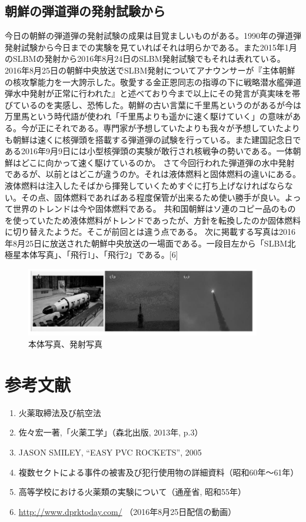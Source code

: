 \subsection{朝鮮の弾道弾の発射試験から}
今日の朝鮮の弾道弾の発射試験の成果は目覚ましいものがある。1990年の弾道弾発射試験から今日までの実験を見ていればそれは明らかである。また2015年1月のSLBMの発射から2016年8月24日のSLBM発射試験でもそれは表れている。
2016年8月25日の朝鮮中央放送でSLBM発射についてアナウンサーが『主体朝鮮の核攻撃能力を一大誇示した。敬愛する金正恩同志の指導の下に戦略潜水艦弾道弾水中発射が正常に行われた』と述べており今まで以上にその発言が真実味を帯びているのを実感し、恐怖した。朝鮮の古い言葉に千里馬というのがあるが今は万里馬という時代語が使われ「千里馬よりも遥かに速く駆けていく」の意味がある。今が正にそれである。専門家が予想していたよりも我々が予想していたよりも朝鮮は速くに核弾頭を搭載する弾道弾の試験を行っている。また建国記念日である2016年9月9日には小型核弾頭の実験が敢行され核戦争の勢いである。一体朝鮮はどこに向かって速く駆けているのか。
さて今回行われた弾道弾の水中発射であるが、以前とはどこが違うのか。それは液体燃料と固体燃料の違いにある。液体燃料は注入したそばから揮発していくためすぐに打ち上げなければならない。その点、固体燃料であればある程度保管が出来るため使い勝手が良い。よって世界のトレンドは今や固体燃料である。
共和国朝鮮はソ連のコピー品のものを使っていたため液体燃料がトレンドであったが、方針を転換したのか固体燃料に切り替えたようだ。そこが前回とは違う点である。
次に掲載する写真は2016年8月25日に放送された朝鮮中央放送の一場面である。一段目左から「SLBM北極星本体写真」、「飛行1」、「飛行2」である。[6]

\begin{figure}[H]
  \centering
  \includegraphics[height=3cm,clip]{okada/image/9no.png}
  \caption{本体写真、発射写真}
  \label{fig:9no}
\end{figure}

\newpage
\section*{参考文献}
\begin{enumerate}
  \item	火薬取締法及び航空法
  \item 佐々宏一著,「火薬工学」（森北出版, 2013年, p.3）
  \item JASON SMILEY, “EASY PVC ROCKETS”, 2005
  \item 複数セクトによる事件の被害及び犯行使用物の詳細資料（昭和60年～61年）
  \item 高等学校における火薬類の実験について（通産省, 昭和55年）
  \item \url{http://www.dprktoday.com/} （2016年8月25日配信の動画）
\end{enumerate}


